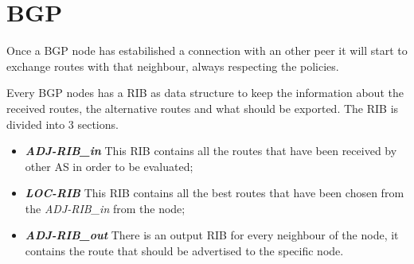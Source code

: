 
\section{BGP}
\label{sec:bgp_intro}

Once a \ac{BGP} node has estabilished a connection with an other peer it will
start to exchange routes with that neighbour, always respecting the policies.

Every \ac{BGP} nodes has a \ac{RIB} as data structure to keep the information
about the received routes, the alternative routes and what should be exported.
The \ac{RIB} is divided into \num{3} sections.
\begin{itemize}
	\item \textbf{\textit{ADJ-RIB\_in}} This \ac{RIB} contains all the routes
		that have been received by other \ac{AS} in order to be evaluated;
	\item \textbf{\textit{LOC-RIB}} This \ac{RIB} contains all the best routes
		that have been chosen from the \textit{ADJ-RIB\_in} from the node;
	\item \textbf{\textit{ADJ-RIB\_out}} There is an output \ac{RIB} for every
		neighbour of the node, it contains the route that should be advertised 
		to the specific node.
\end{itemize}

